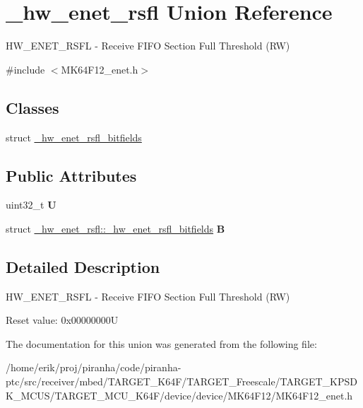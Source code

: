 \hypertarget{union__hw__enet__rsfl}{}\section{\+\_\+hw\+\_\+enet\+\_\+rsfl Union Reference}
\label{union__hw__enet__rsfl}


H\+W\+\_\+\+E\+N\+E\+T\+\_\+\+R\+S\+FL -\/ Receive F\+I\+FO Section Full Threshold (RW)  




{\ttfamily \#include $<$M\+K64\+F12\+\_\+enet.\+h$>$}

\subsection*{Classes}
\begin{DoxyCompactItemize}
\item 
struct \hyperlink{struct__hw__enet__rsfl_1_1__hw__enet__rsfl__bitfields}{\+\_\+hw\+\_\+enet\+\_\+rsfl\+\_\+bitfields}
\end{DoxyCompactItemize}
\subsection*{Public Attributes}
\begin{DoxyCompactItemize}
\item 
uint32\+\_\+t {\bfseries U}\hypertarget{union__hw__enet__rsfl_aebf563e48d6315ea8a6ccd10c8c60c0c}{}\label{union__hw__enet__rsfl_aebf563e48d6315ea8a6ccd10c8c60c0c}

\item 
struct \hyperlink{struct__hw__enet__rsfl_1_1__hw__enet__rsfl__bitfields}{\+\_\+hw\+\_\+enet\+\_\+rsfl\+::\+\_\+hw\+\_\+enet\+\_\+rsfl\+\_\+bitfields} {\bfseries B}\hypertarget{union__hw__enet__rsfl_a413ab79dc2b56da4fd8d6263d8f4b6de}{}\label{union__hw__enet__rsfl_a413ab79dc2b56da4fd8d6263d8f4b6de}

\end{DoxyCompactItemize}


\subsection{Detailed Description}
H\+W\+\_\+\+E\+N\+E\+T\+\_\+\+R\+S\+FL -\/ Receive F\+I\+FO Section Full Threshold (RW) 

Reset value\+: 0x00000000U 

The documentation for this union was generated from the following file\+:\begin{DoxyCompactItemize}
\item 
/home/erik/proj/piranha/code/piranha-\/ptc/src/receiver/mbed/\+T\+A\+R\+G\+E\+T\+\_\+\+K64\+F/\+T\+A\+R\+G\+E\+T\+\_\+\+Freescale/\+T\+A\+R\+G\+E\+T\+\_\+\+K\+P\+S\+D\+K\+\_\+\+M\+C\+U\+S/\+T\+A\+R\+G\+E\+T\+\_\+\+M\+C\+U\+\_\+\+K64\+F/device/device/\+M\+K64\+F12/M\+K64\+F12\+\_\+enet.\+h\end{DoxyCompactItemize}
